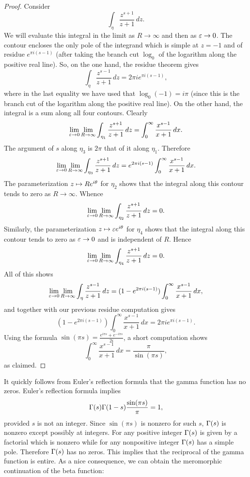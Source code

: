 \begin{proof}
      Consider
      \[
        \int_{\eta}\frac{z^{s+1}}{z+1}\,dz.
      \]
      We will evaluate this integral in the limit as \(R \to \infty\) and then as \(\varepsilon \to 0\). The contour encloses the only pole of the integrand which is simple at \(z = -1\) and of residue \(e^{\pi i(s-1)}\) (after taking the branch cut \(\log_{0}\) of the logarithm along the positive real line). So, on the one hand, the residue theorem gives
      \[
        \int_{\eta}\frac{z^{s-1}}{z+1}\,dz = 2\pi ie^{\pi i(s-1)},
      \]
      where in the last equality we have used that \(\log_{0}(-1) = i\pi\) (since this is the branch cut of the logarithm along the positive real line). On the other hand, the integral is a sum along all four contours. Clearly
      \[
        \lim_{\varepsilon \to 0}\lim_{R \to \infty}\int_{\eta_{1}}\frac{z^{s+1}}{z+1}\,dz = \int_{0}^{\infty}\frac{x^{s-1}}{x+1}\,dx.
      \]
      The argument of \(s\) along \(\eta_{3}\) is \(2\pi\) that of it along \(\eta_{1}\). Therefore
      \[
        \lim_{\varepsilon \to 0}\lim_{R \to \infty}\int_{\eta_{3}}\frac{z^{s+1}}{z+1}\,dz = e^{2\pi i(s-1)}\int_{0}^{\infty}\frac{x^{s-1}}{x+1}\,dx.
      \]
      The parameterization \(z \mapsto Re^{i\theta}\) for \(\eta_{2}\) shows that the integral along this contour tends to zero as \(R \to \infty\). Whence
      \[
        \lim_{\varepsilon \to 0}\lim_{R \to \infty}\int_{\eta_{2}}\frac{z^{s+1}}{z+1}\,dz = 0.
      \]
      Similarly, the parameterization \(z \mapsto \varepsilon e^{i\theta}\) for \(\eta_{4}\) shows that the integral along this contour tends to zero as \(\varepsilon \to 0\) and is independent of \(R\). Hence 
      \[
        \lim_{\varepsilon \to 0}\lim_{R \to \infty}\int_{\eta_{4}}\frac{z^{s+1}}{z+1}\,dz = 0.
      \]
      All of this shows
      \[
        \lim_{\varepsilon \to 0}\lim_{R \to \infty} \int_{\eta}\frac{z^{s-1}}{z+1}\,dz = (1-e^{2\pi i(s-1)})\int_{0}^{\infty}\frac{x^{s-1}}{x+1}\,dx,
      \]
      and together with our previous residue computation gives
      \[
        (1-e^{2\pi i(s-1)})\int_{0}^{\infty}\frac{x^{s-1}}{x+1}\,dx = 2\pi ie^{\pi i(s-1)}.
      \]
      Using the formula \(\sin(\pi s) = \frac{e^{i\pi s}+e^{-i\pi s}}{2i}\), a short computation shows
      \[
        \int_{0}^{\infty}\frac{x^{s-1}}{x+1}\,dx = \frac{\pi}{\sin(\pi s)},
      \]
      as claimed.
    \end{proof}

    It quickly follows from Euler's reflection formula that the gamma function has no zeros. Euler's reflection formula implies
    \[
      \Gamma(s)\Gamma(1-s)\frac{\sin(\pi s)}{\pi} = 1,
    \]
    provided \(s\) is not an integer. Since \(\sin(\pi s)\) is nonzero for such \(s\), \(\Gamma(s)\) is nonzero except possibly at integers. For any positive integer \(\Gamma(s)\) is given by a factorial which is nonzero while for any nonpositive integer \(\Gamma(s)\) has a simple pole. Therefore \(\Gamma(s)\) has no zeros. This implies that the reciprocal of the gamma function is entire. As a nice consequence, we can obtain the meromorphic continuation of the beta function:

